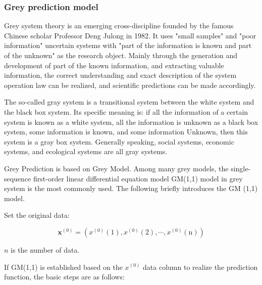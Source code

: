 \documentclass[12pt]{article}  %
\begin{document}
\subsubsection{Grey prediction model}
Grey system theory is an emerging cross-discipline founded by the famous Chinese scholar Professor Deng Julong in 1982. It uses "small samples" and "poor information" uncertain systems with "part of the information is known and part of the unknown" as the research object. Mainly through the generation and development of part of the known information, and extracting valuable information, the correct understanding and exact description of the system operation law can be realized, and scientific predictions can be made accordingly.

The so-called gray system is a transitional system between the white system and the black box system. Its specific meaning is: if all the information of a certain system is known as a white system, all the information is unknown as a black box system, some information is known, and some information Unknown, then this system is a gray box system. Generally speaking, social systems, economic systems, and ecological systems are all gray systems.

Grey Prediction is based on Grey Model. Among many grey models, the single-sequence first-order linear differential equation model GM(1,1) model in grey system is the most commonly used. The following briefly introduces the GM (1,1) model.

Set the original data:

\begin{equation}\label{eq:heat2}\mathbf{x}^{(0)}=\left(x^{(0)}(1), x^{(0)}(2), \cdots, x^{(0)}(\mathrm{n})\right)\end{equation}

$n$ is the number of data.

If GM(1,1) is established based on the $x^{(0)}$  data column to realize the prediction function, the basic steps are as follows:
\end{document}
